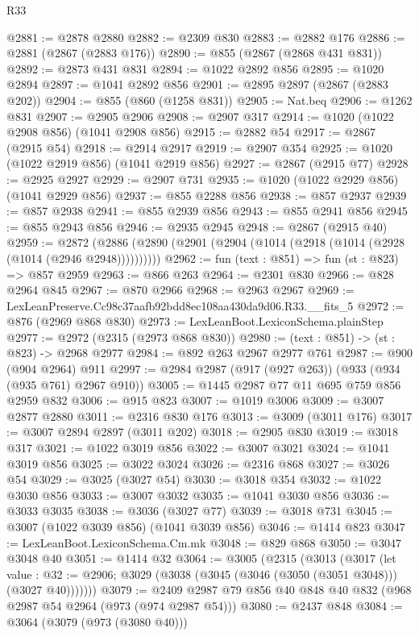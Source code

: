 \begin{lexlean}{R33}
\begin{coremodule}
@2881 := @2878 @2880
@2882 := @2309 @830
@2883 := @2882 @176
@2886 := @2881 (@2867 (@2883 @176))
@2890 := @855 (@2867 (@2868 @431 @831))
@2892 := @2873 @431 @831
@2894 := @1022 @2892 @856
@2895 := @1020 @2894
@2897 := @1041 @2892 @856
@2901 := @2895 @2897 (@2867 (@2883 @202))
@2904 := @855 (@860 (@1258 @831))
@2905 := Nat.beq
@2906 := @1262 @831
@2907 := @2905 @2906
@2908 := @2907 @317
@2914 := @1020 (@1022 @2908 @856) (@1041 @2908 @856)
@2915 := @2882 @54
@2917 := @2867 (@2915 @54)
@2918 := @2914 @2917
@2919 := @2907 @354
@2925 := @1020 (@1022 @2919 @856) (@1041 @2919 @856)
@2927 := @2867 (@2915 @77)
@2928 := @2925 @2927
@2929 := @2907 @731
@2935 := @1020 (@1022 @2929 @856) (@1041 @2929 @856)
@2937 := @855 @2288 @856
@2938 := @857 @2937
@2939 := @857 @2938
@2941 := @855 @2939 @856
@2943 := @855 @2941 @856
@2945 := @855 @2943 @856
@2946 := @2935 @2945
@2948 := @2867 (@2915 @40)
@2959 := @2872 (@2886 (@2890 (@2901 (@2904 (@1014 (@2918 (@1014 (@2928 (@1014 (@2946 @2948))))))))))
@2962 := fun (text : @851) => fun (st : @823) => @857 @2959
@2963 := @866 @263
@2964 := @2301 @830
@2966 := @828 @2964 @845
@2967 := @870 @2966
@2968 := @2963 @2967
@2969 := LexLeanPreserve.Cc98c37aafb92bdd8ec108aa430da9d06.R33.__fits_5
@2972 := @876 (@2969 @868 @830)
@2973 := LexLeanBoot.LexiconSchema.plainStep
@2977 := @2972 (@2315 (@2973 @868 @830))
@2980 := (text : @851) -> (st : @823) -> @2968 @2977
@2984 := @892 @263 @2967 @2977 @761
@2987 := @900 (@904 @2964) @911
@2997 := @2984 @2987 (@917 (@927 @263)) (@933 (@934 (@935 @761) @2967 @910))
@3005 := @1445 @2987 @77 @11 @695 @759 @856 @2959 @832
@3006 := @915 @823
@3007 := @1019 @3006
@3009 := @3007 @2877 @2880
@3011 := @2316 @830 @176
@3013 := @3009 (@3011 @176)
@3017 := @3007 @2894 @2897 (@3011 @202)
@3018 := @2905 @830
@3019 := @3018 @317
@3021 := @1022 @3019 @856
@3022 := @3007 @3021
@3024 := @1041 @3019 @856
@3025 := @3022 @3024
@3026 := @2316 @868
@3027 := @3026 @54
@3029 := @3025 (@3027 @54)
@3030 := @3018 @354
@3032 := @1022 @3030 @856
@3033 := @3007 @3032
@3035 := @1041 @3030 @856
@3036 := @3033 @3035
@3038 := @3036 (@3027 @77)
@3039 := @3018 @731
@3045 := @3007 (@1022 @3039 @856) (@1041 @3039 @856)
@3046 := @1414 @823
@3047 := LexLeanBoot.LexiconSchema.Cm.mk
@3048 := @829 @868
@3050 := @3047 @3048 @40
@3051 := @1414 @32
@3064 := @3005
    (@2315
      (@3013
        (@3017
          (let value : @32 := @2906;
          @3029 (@3038 (@3045 (@3046 (@3050 (@3051 @3048))) (@3027 @40)))))))
@3079 := @2409 @2987 @79 @856 @40 @848 @40 @832 (@968 @2987 @54 @2964 (@973 (@974 @2987 @54)))
@3080 := @2437 @848
@3084 := @3064 (@3079 (@973 (@3080 @40)))

\end{coremodule}
\end{lexlean}
